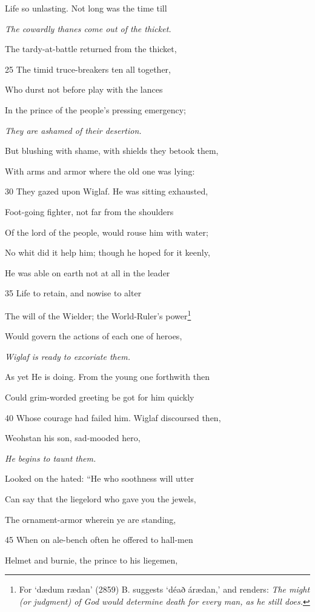 Life so unlasting. Not long was the time till

\emph{The cowardly
thanes come out
of the thicket.}

The tardy-at-battle returned from the thicket,

25
The timid truce-breakers ten all together,

Who durst not before play with the lances

In the prince of the people’s pressing emergency;

\emph{They are ashamed
of their desertion.}

But blushing with shame, with shields they betook them,

With arms and armor where the old one was lying:

30
They gazed upon Wiglaf. He was sitting exhausted,

Foot-going fighter, not far from the shoulders

Of the lord of the people, would rouse him with water;

No whit did it help him; though he hoped for it keenly,

He was able on earth not at all in the leader

35
Life to retain, and nowise to alter

The will of the Wielder; the World-Ruler’s power\footnote{For ‘dædum rædan’ (2859) B. suggests ‘déað árædan,’ and renders: \emph{The
might (or judgment) of God would determine death for every man, as he still
does.}}

Would govern the actions of each one of heroes,

\emph{Wiglaf is ready to
excoriate them.}

As yet He is doing. From the young one forthwith then

Could grim-worded greeting be got for him quickly

40
Whose courage had failed him. Wiglaf discoursed then,

Weohstan his son, sad-mooded hero,

\emph{He begins to taunt
them.}

Looked on the hated: “He who soothness will utter

Can say that the liegelord who gave you the jewels,

The ornament-armor wherein ye are standing,

45
When on ale-bench often he offered to hall-men

Helmet and burnie, the prince to his liegemen,

